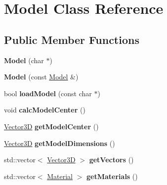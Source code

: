 \hypertarget{class_model}{}\section{Model Class Reference}
\label{class_model}
\subsection*{Public Member Functions}
\begin{DoxyCompactItemize}
\item 
{\bfseries Model} (char $\ast$)\hypertarget{class_model_acf455b46c4e80f1736f0d81b67bea1f8}{}\label{class_model_acf455b46c4e80f1736f0d81b67bea1f8}

\item 
{\bfseries Model} (const \hyperlink{class_model}{Model} \&)\hypertarget{class_model_a0386968ae522e868e3b6028c8b154837}{}\label{class_model_a0386968ae522e868e3b6028c8b154837}

\item 
bool {\bfseries load\+Model} (const char $\ast$)\hypertarget{class_model_a25792de725bf3e5d16b6d17af762f49a}{}\label{class_model_a25792de725bf3e5d16b6d17af762f49a}

\item 
void {\bfseries calc\+Model\+Center} ()\hypertarget{class_model_a554d27aa6a6d2e93be7d957f3b610f78}{}\label{class_model_a554d27aa6a6d2e93be7d957f3b610f78}

\item 
\hyperlink{class_vector3_d}{Vector3D} {\bfseries get\+Model\+Center} ()\hypertarget{class_model_a3616941d01a129c90a81891f6aa78819}{}\label{class_model_a3616941d01a129c90a81891f6aa78819}

\item 
\hyperlink{class_vector3_d}{Vector3D} {\bfseries get\+Model\+Dimensions} ()\hypertarget{class_model_a11ca5f07bd3e8b60ed5cb70ab673dc50}{}\label{class_model_a11ca5f07bd3e8b60ed5cb70ab673dc50}

\item 
std\+::vector$<$ \hyperlink{class_vector3_d}{Vector3D} $>$ {\bfseries get\+Vectors} ()\hypertarget{class_model_ab37cfe36bfc8ba85a0894cb11c156e11}{}\label{class_model_ab37cfe36bfc8ba85a0894cb11c156e11}

\item 
std\+::vector$<$ \hyperlink{class_material}{Material} $>$ {\bfseries get\+Materials} ()\hypertarget{class_model_acebb51323259e2f11494e0626490c64e}{}\label{class_model_acebb51323259e2f11494e0626490c64e}


\end{DoxyCompactItemize}
